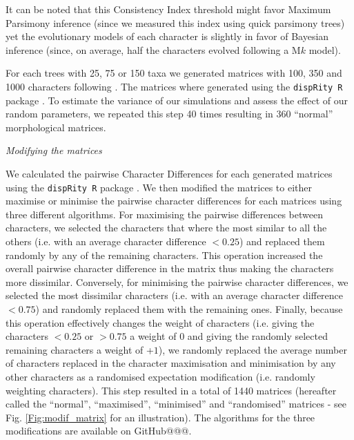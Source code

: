 \documentclass[12pt,letterpaper]{article}
\renewcommand{\subsection}[1]{%
\bigskip
\begin{center}
\begin{large}
\normalfont\itshape #1
\end{large}
\end{center}}
\begin{document}
It can be noted that this Consistency Index threshold might favor Maximum Parsimony inference (since we measured this index using quick parsimony trees) yet the evolutionary models of each character is slightly in favor of Bayesian inference (since, on average, half the characters evolved following a M$k$ model).

For each trees with 25, 75 or 150 taxa we generated matrices with 100, 350 and 1000 characters following \cite{OReilly20160081}.
The matrices where generated using the \texttt{dispRity R} package \citep{thomas_guillerme_2016_55646}.
To estimate the variance of our simulations and assess the effect of our random parameters, we repeated this step 40 times resulting in 360 ``normal'' morphological matrices.

\subsection{Modifying the matrices}
We calculated the pairwise Character Differences for each generated matrices using the \texttt{dispRity R} package \citep{thomas_guillerme_2016_55646}. %
We then modified the matrices to either maximise or minimise the pairwise character differences for each matrices using three different algorithms.
For maximising the pairwise differences between characters, we selected the characters that where the most similar to all the others (i.e. with an average character difference $<$$0.25$) and replaced them randomly by any of the remaining characters.
This operation increased the overall pairwise character difference in the matrix thus making the characters more dissimilar.
Conversely, for minimising the pairwise character differences, we selected the most dissimilar characters (i.e. with an average character difference $<$$0.75$) and randomly replaced them with the remaining ones.
Finally, because this operation effectively changes the weight of characters (i.e. giving the characters $<$$0.25$ or $>$$0.75$ a weight of $0$ and giving the randomly selected remaining characters a weight of +$1$), we randomly replaced the average number of characters replaced in the character maximisation and minimisation by any other characters as a randomised expectation modification (i.e. randomly weighting characters).
This step resulted in a total of 1440 matrices (hereafter called the ``normal'', ``maximised'', ``minimised'' and ``randomised'' matrices - see Fig. \ref{Fig:modif_matrix} for an illustration).
The algorithms for the three modifications are available on GitHub@@@. %
\end{document}
